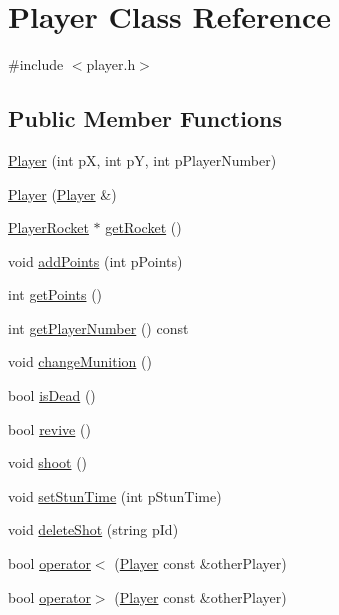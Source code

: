 \hypertarget{class_player}{\section{Player Class Reference}
\label{class_player}
}


{\ttfamily \#include $<$player.\-h$>$}

\subsection*{Public Member Functions}
\begin{DoxyCompactItemize}
\item 
\hyperlink{class_player_a24659ea97da1acc913319776705aab94}{Player} (int p\-X, int p\-Y, int p\-Player\-Number)
\item 
\hyperlink{class_player_ad2d305f9af724e761a491b7a85a020e0}{Player} (\hyperlink{class_player}{Player} \&)
\item 
\hyperlink{class_player_rocket}{Player\-Rocket} $\ast$ \hyperlink{class_player_ae994ea7007d6da03e2b07941ec57d487}{get\-Rocket} ()
\item 
void \hyperlink{class_player_a609d8bc41b5975dc84419ebf8499af78}{add\-Points} (int p\-Points)
\item 
int \hyperlink{class_player_ab98ee3c0e10f7b2b65ad43b2a2929445}{get\-Points} ()
\item 
int \hyperlink{class_player_ad6220515daeec578e4edcebb0b304df4}{get\-Player\-Number} () const 
\item 
void \hyperlink{class_player_a2c86a52ca55e44e2de9115e0c736a155}{change\-Munition} ()
\item 
bool \hyperlink{class_player_ac0b88c415cb264d54c227dd4ef82a7d1}{is\-Dead} ()
\item 
bool \hyperlink{class_player_a0a1f2222ab92d321474bd52147a2b1df}{revive} ()
\item 
void \hyperlink{class_player_a4cdc67fd9ca2de09af89d9ae19efe5f8}{shoot} ()
\item 
void \hyperlink{class_player_ae02c3ddb3bff99fd2375c552e51b8560}{set\-Stun\-Time} (int p\-Stun\-Time)
\item 
void \hyperlink{class_player_a4f5d43c9f4394429fef4106715529ed7}{delete\-Shot} (string p\-Id)
\item 
bool \hyperlink{class_player_a7a3afa150767d2c07968dc6d04b145b8}{operator$<$} (\hyperlink{class_player}{Player} const \&other\-Player)
\item 
bool \hyperlink{class_player_aee44ed3cca127251cf0f65102c89dd8f}{operator$>$} (\hyperlink{class_player}{Player} const \&other\-Player)

\end{DoxyCompactItemize}
